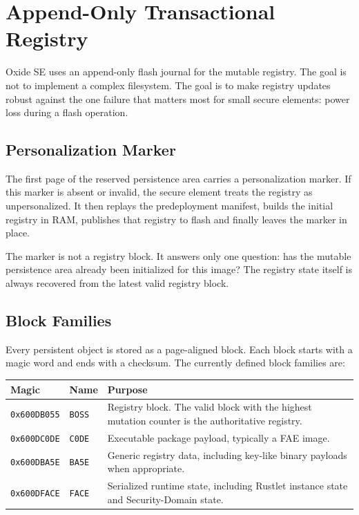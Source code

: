 \section{Append-Only Transactional Registry}
\label{sec:append-only-transactional-registry}

Oxide SE uses an append-only flash journal for the mutable registry. The
goal is not to implement a complex filesystem. The goal is to make registry
updates robust against the one failure that matters most for small secure
elements: power loss during a flash operation.

\subsection{Personalization Marker}
\label{subsec:persistence-personalization-marker}

The first page of the reserved persistence area carries a personalization
marker. If this marker is absent or invalid, the secure element treats the
registry as unpersonalized. It then replays the predeployment manifest,
builds the initial registry in RAM, publishes that registry to flash and
finally leaves the marker in place.

The marker is not a registry block. It answers only one question: has the
mutable persistence area already been initialized for this image? The
registry state itself is always recovered from the latest valid registry
block.

\subsection{Block Families}
\label{subsec:persistence-block-families}

Every persistent object is stored as a page-aligned block. Each block starts
with a magic word and ends with a checksum. The currently defined block
families are:

\begin{center}
\begin{tabular}{|l|l|p{7.5cm}|}
\hline
\textbf{Magic} & \textbf{Name} & \textbf{Purpose} \\
\hline
\texttt{0x600DB055} & \texttt{BOSS} &
Registry block. The valid block with the highest mutation counter is the
authoritative registry. \\
\hline
\texttt{0x600DC0DE} & \texttt{C0DE} &
Executable package payload, typically a FAE image. \\
\hline
\texttt{0x600DBA5E} & \texttt{BA5E} &
Generic registry data, including key-like binary payloads when appropriate. \\
\hline
\texttt{0x600DFACE} & \texttt{FACE} &
Serialized runtime state, including Rustlet instance state and
Security-Domain state. \\
\hline
\end{tabular}
\end{center}

